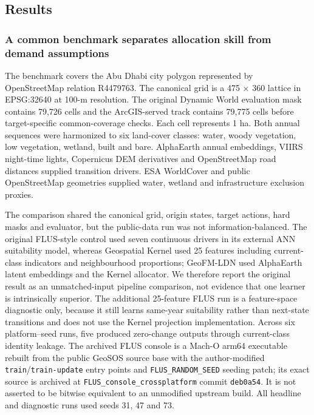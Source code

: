 \subsection{Results}\label{results}

\subsubsection{A common benchmark separates allocation skill from demand
assumptions}\label{a-common-benchmark-separates-allocation-skill-from-demand-assumptions}

The benchmark covers the Abu Dhabi city polygon represented by
OpenStreetMap relation R4479763. The canonical grid is a 475 × 360
lattice in EPSG:32640 at 100-m resolution. The original Dynamic World
evaluation mask contains 79,726 cells and the ArcGIS-served track
contains 79,775 cells before target-specific common-coverage checks.
Each cell represents 1 ha. Both annual sequences were harmonized to six
land-cover classes: water, woody vegetation, low vegetation, wetland,
built and bare. AlphaEarth annual embeddings, VIIRS night-time lights,
Copernicus DEM derivatives and OpenStreetMap road distances supplied
transition drivers. ESA WorldCover and public OpenStreetMap geometries
supplied water, wetland and infrastructure exclusion proxies.

The comparison shared the canonical grid, origin states, target actions,
hard masks and evaluator, but the public-data run was not
information-balanced. The original FLUS-style control used seven
continuous drivers in its external ANN suitability model, whereas
Geospatial Kernel used 25 features including current-class indicators
and neighbourhood proportions; GeoFM-LDN used AlphaEarth latent
embeddings and the Kernel allocator. We therefore report the original
result as an unmatched-input pipeline comparison, not evidence that one
learner is intrinsically superior. The additional 25-feature FLUS run is
a feature-space diagnostic only, because it still learns same-year
suitability rather than next-state transitions and does not use the
Kernel projection implementation. Across six platform--seed runs, five
produced zero-change outputs through current-class identity leakage. The
archived FLUS console is a Mach-O arm64 executable rebuilt from the
public GeoSOS source base with the author-modified
\texttt{train}/\texttt{train-update} entry points and
\texttt{FLUS\_RANDOM\_SEED} seeding patch; its exact source is archived
at \texttt{FLUS\_console\_crossplatform} commit \texttt{deb0a54}. It is
not asserted to be bitwise equivalent to an unmodified upstream build.
All headline and diagnostic runs used seeds 31, 47 and 73.


